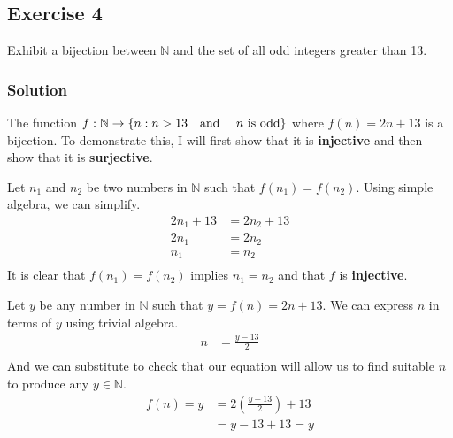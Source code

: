\documentclass[12pt]{article}
\begin{document}
\begin{flushleft}
\subsection*{Exercise 4}
Exhibit a bijection between $\mathbb{N}$ and the set of all odd integers greater than 13.
\subsubsection*{Solution}
The function $f : \mathbb{N} \rightarrow \left\{n : n > 13 \text{\quad and \quad $n$ is odd}\right\}$ where $f\left(n\right) = 2n + 13$ is a bijection. To demonstrate this, I will first show that it is \textbf{injective} and then show that it is \textbf{surjective}.

Let $n_1$ and $n_2$ be two numbers in $\mathbb{N}$ such that $f\left(n_1\right) = f\left(n_2\right)$. Using simple algebra, we can simplify.
\begin{align*}
2n_1 + 13 &= 2n_2 + 13 \\
2n_1 &= 2n_2 \\
n_1 &= n_2 \\
\end{align*}
It is clear that $f\left(n_1\right) = f\left(n_2\right)$ implies $n_1 = n_2$ and that $f$ is \textbf{injective}.

Let $y$ be any number in $\mathbb{N}$ such that $y = f\left(n\right) = 2n + 13$. We can express $n$ in terms of $y$ using trivial algebra.
\begin{align*}
n &= \frac{y - 13}{2} \\
\end{align*}
And we can substitute to check that our equation will allow us to find suitable $n$ to produce any $y \in \mathbb{N}$.
\begin{align*}
f\left(n\right) = y &= 2\left(\frac{y - 13}{2}\right) + 13 \\
&= y - 13 + 13 = y\\
\end{align*}
\end{flushleft}
\end{document}
